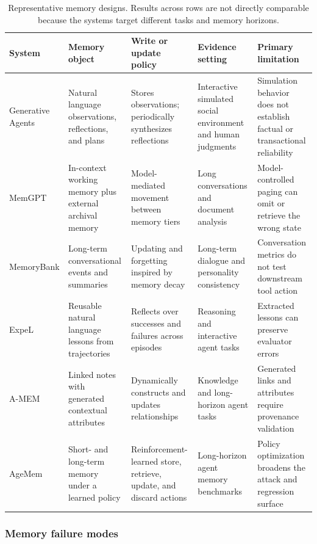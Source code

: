 \begin{table}[!htbp]
\centering
\caption{Representative memory designs. Results across rows are not directly comparable because the systems target different tasks and memory horizons.}
\label{tab:memory-evidence}
\small
\surveytableformat
\begin{tabularx}{\textwidth}{L{2.45cm}L{3.0cm}L{3.0cm}L{3.1cm}Y}
\toprule
{}\textbf{System} & \textbf{Memory object} & \textbf{Write or update policy} & \textbf{Evidence setting} & \textbf{Primary limitation} \\
\midrule
Generative Agents~\cite{park2023generativeagents} & Natural language observations, reflections, and plans & Stores observations; periodically synthesizes reflections & Interactive simulated social environment and human judgments & Simulation behavior does not establish factual or transactional reliability \\
MemGPT~\cite{packer2024memgpt} & In-context working memory plus external archival memory & Model-mediated movement between memory tiers & Long conversations and document analysis & Model-controlled paging can omit or retrieve the wrong state \\
Memory\-Bank\newline\cite{zhong2024memorybank} & Long-term conversational events and summaries & Updating and forgetting inspired by memory decay & Long-term dialogue and personality consistency & Conversation metrics do not test downstream tool action \\
ExpeL~\cite{zhao2024expel} & Reusable natural language lessons from trajectories & Reflects over successes and failures across episodes & Reasoning and interactive agent tasks & Extracted lessons can preserve evaluator errors \\
A-MEM~\cite{xu2025amem} & Linked notes with generated contextual attributes & Dynamically constructs and updates relationships & Knowledge and long-horizon agent tasks & Generated links and attributes require provenance validation \\
AgeMem~\cite{yu2026agemem} & Short- and long-term memory under a learned policy & Reinforcement-learned store, retrieve, update, and discard actions & Long-horizon agent memory benchmarks & Policy optimization broadens the attack and regression surface \\
\bottomrule
\end{tabularx}
\end{table}

\subsubsection{Memory failure modes}

